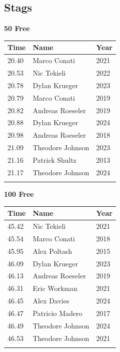 \subsection{Stags}
\vspace{1.2em}
\noindent\begin{minipage}[t]{0.48\textwidth}
\centering
\textbf{\textcolor{teamprimary}{50 Free}}\par
\vspace{0.5em}
\centering
\small
\renewcommand{\arraystretch}{1.0}
\setlength{\tabcolsep}{4pt}
\begin{tabular}{@{}p{1.8cm}p{3.0cm}p{1.0cm}@{}}
\toprule
\textbf{Time} & \textbf{Name} & \textbf{Year} \\
\midrule
20.40 & Marco Conati & 2021 \\
20.53 & Nic Tekieli & 2022 \\
20.78 & Dylan Krueger & 2023 \\
20.79 & Marco Conati & 2019 \\
20.82 & Andreas Roeseler & 2019 \\
20.88 & Dylan Krueger & 2024 \\
20.98 & Andreas Roeseler & 2018 \\
21.09 & Theodore Johnson & 2023 \\
21.16 & Patrick Shultz & 2013 \\
21.17 & Theodore Johnson & 2024 \\
\bottomrule
\vspace{0.5em}
\end{tabular}
\end{minipage}
\hfill
\begin{minipage}[t]{0.48\textwidth}
\centering
\textbf{\textcolor{teamprimary}{100 Free}}\par
\vspace{0.5em}
\centering
\small
\renewcommand{\arraystretch}{1.0}
\setlength{\tabcolsep}{4pt}
\begin{tabular}{@{}p{1.8cm}p{3.0cm}p{1.0cm}@{}}
\toprule
\textbf{Time} & \textbf{Name} & \textbf{Year} \\
\midrule
45.42 & Nic Tekieli & 2021 \\
45.54 & Marco Conati & 2018 \\
45.95 & Alex Poltash & 2015 \\
46.09 & Dylan Krueger & 2023 \\
46.13 & Andreas Roeseler & 2019 \\
46.31 & Eric Workman & 2021 \\
46.45 & Alex Davies & 2024 \\
46.47 & Patricio Madero & 2017 \\
46.49 & Theodore Johnson & 2024 \\
46.53 & Theodore Johnson & 2021 \\
\bottomrule
\vspace{0.5em}
\end{tabular}
\end{minipage}
